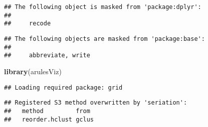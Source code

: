 \documentclass[
]{article}
\newenvironment{Shaded}{\begin{snugshade}}{\end{snugshade}}
\newcommand{\KeywordTok}[1]{\textcolor[rgb]{0.13,0.29,0.53}{\textbf{#1}}}
\newcommand{\NormalTok}[1]{#1}
\begin{document}
\begin{verbatim}
## The following object is masked from 'package:dplyr':
## 
##     recode
\end{verbatim}

\begin{verbatim}
## The following objects are masked from 'package:base':
## 
##     abbreviate, write
\end{verbatim}

\begin{Shaded}
\begin{Highlighting}[]
\KeywordTok{library}\NormalTok{(arulesViz)}
\end{Highlighting}
\end{Shaded}

\begin{verbatim}
## Loading required package: grid
\end{verbatim}

\begin{verbatim}
## Registered S3 method overwritten by 'seriation':
##   method         from 
##   reorder.hclust gclus
\end{verbatim}
\end{document}
